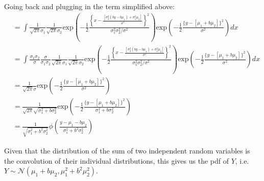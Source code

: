 \documentclass[11pt]{article}
\begin{document}
Going back and plugging in the term simplified above:
\begin{align*}
&=\int \frac{1}{\sqrt{2\pi}\sigma_1} \frac{1}{\sqrt{2\pi}\sigma_2} \text{exp}\left(-\frac{1}{2}\frac{\left\{x-\frac{[\sigma^2_2(by-b\mu_1)+\sigma^2_1\mu_2]}{{\sigma^2}}\right\}^2 }{\sigma^2_1\sigma^2_2/\sigma^2}\right) 
 \text{exp}\left(-\frac{1}{2} \frac{\{y-[\mu_1+b\mu_2]\}^2}{\sigma^2}\right)dx\\
 &=\int \frac{\sigma_1\sigma_2}{\sigma} \frac{\sigma}{\sigma_1\sigma_2 } \frac{1}{\sqrt{2\pi}\sigma_1} \frac{1}{\sqrt{2\pi}\sigma_2} \text{exp}\left(-\frac{1}{2}\frac{\left\{x-\frac{[\sigma^2_2(by-b\mu_1)+\sigma^2_1\mu_2]}{{\sigma^2}}\right\}^2 }{\sigma^2_1\sigma^2_2/\sigma^2}\right) 
 \text{exp}\left(-\frac{1}{2} \frac{\{y-[\mu_1+b\mu_2]\}^2}{\sigma^2}\right)dx\\
  &=  \frac{1}{\sqrt{2\pi}\sigma} 
 \text{exp}\left(-\frac{1}{2} \frac{\{y-[\mu_1+b\mu_2]\}^2}{\sigma^2}\right)\\
  &=  \frac{1}{\sqrt{2\pi}\sqrt{\sigma^2_1+b\sigma^2_2}} 
 \text{exp}\left(-\frac{1}{2} \frac{\{y-[\mu_1+b\mu_2]\}^2}{\sigma^2_1+b\sigma^2_2}\right)\\
   &=  \frac{1}{\sqrt{\sigma^2_1+b^2\sigma^2_2}} \phi \left( \frac{y-\mu_1-b\mu_2}{{\sigma^2_1+b^2\sigma^2_2}}\right)
 \end{align*}
 
Given that the distribution of the sum of two   independent random variables is the convolution of their individual distributions,
this gives us the pdf of $Y$, i.e. $Y \sim \mathcal{N}(\mu_1+b\mu_2, \mu_1^2+b^2\mu^2_2)$. 
\end{document}
